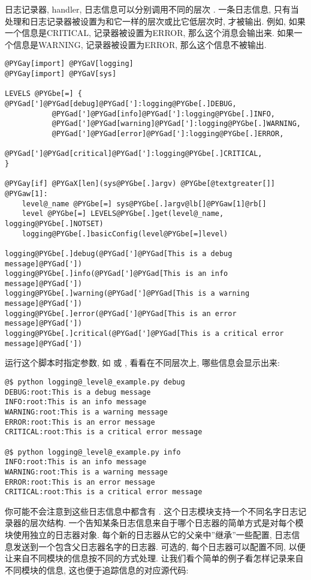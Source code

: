 \documentclass[a4paper,10pt,english]{manual}
\begin{document}
日志记录器, handler, 日志信息可以分别调用不同的层次 . 一条日志信息, 只有当处理和日志记录器被设置为和它一样的层次或比它低层次时, 才被输出. 例如, 如果一个信息是CRITICAL, 记录器被设置为ERROR, 那么这个消息会输出来. 如果一个信息是WARNING, 记录器被设置为ERROR, 那么这个信息不被输出.

\begin{Verbatim}[commandchars=@\[\]]
@PYGay[import] @PYGaV[logging]
@PYGay[import] @PYGaV[sys]

LEVELS @PYGbe[=] { @PYGad[']@PYGad[debug]@PYGad[']:logging@PYGbe[.]DEBUG,
           @PYGad[']@PYGad[info]@PYGad[']:logging@PYGbe[.]INFO,
           @PYGad[']@PYGad[warning]@PYGad[']:logging@PYGbe[.]WARNING,
           @PYGad[']@PYGad[error]@PYGad[']:logging@PYGbe[.]ERROR,
           @PYGad[']@PYGad[critical]@PYGad[']:logging@PYGbe[.]CRITICAL,
}

@PYGay[if] @PYGaX[len](sys@PYGbe[.]argv) @PYGbe[@textgreater[]] @PYGaw[1]:
    level@_name @PYGbe[=] sys@PYGbe[.]argv@lb[]@PYGaw[1]@rb[]
    level @PYGbe[=] LEVELS@PYGbe[.]get(level@_name, logging@PYGbe[.]NOTSET)
    logging@PYGbe[.]basicConfig(level@PYGbe[=]level)

logging@PYGbe[.]debug(@PYGad[']@PYGad[This is a debug message]@PYGad['])
logging@PYGbe[.]info(@PYGad[']@PYGad[This is an info message]@PYGad['])
logging@PYGbe[.]warning(@PYGad[']@PYGad[This is a warning message]@PYGad['])
logging@PYGbe[.]error(@PYGad[']@PYGad[This is an error message]@PYGad['])
logging@PYGbe[.]critical(@PYGad[']@PYGad[This is a critical error message]@PYGad['])
\end{Verbatim}

运行这个脚本时指定参数, 如  或 , 看看在不同层次上, 哪些信息会显示出来:

\begin{Verbatim}[commandchars=@\[\]]
@$ python logging@_level@_example.py debug
DEBUG:root:This is a debug message
INFO:root:This is an info message
WARNING:root:This is a warning message
ERROR:root:This is an error message
CRITICAL:root:This is a critical error message

@$ python logging@_level@_example.py info
INFO:root:This is an info message
WARNING:root:This is a warning message
ERROR:root:This is an error message
CRITICAL:root:This is a critical error message
\end{Verbatim}

你可能不会注意到这些日志信息中都含有 . 这个日志模块支持一个不同名字日志记录器的层次结构. 一个告知某条日志信息来自于哪个日志器的简单方式是对每个模块使用独立的日志器对象. 每个新的日志器从它的父亲中''继承''一些配置, 日志信息发送到一个包含父日志器名字的日志器. 可选的, 每个日志器可以配置不同, 以便让来自不同模块的信息按不同的方式处理. 让我们看个简单的例子看怎样记录来自不同模块的信息, 这也便于追踪信息的对应源代码:
\end{document}
